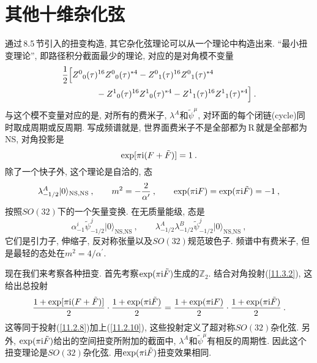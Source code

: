 \section{其他十维杂化弦}

通过\,8.5\,节引入的扭变构造, 其它杂化弦理论可以从一个理论中构造出来. ``最小扭变理论'', 即路径积分截面最少的理论, 对应的是对角模不变量
\begin{align}
    &\frac{1}{2}\Bigl[
    Z^{0}{}_{0}(\tau)^{16}Z^{0}{}_{0}(\tau)^{\ast 4}- Z^{0}{}_{1}(\tau)^{16}Z^{0}{}_{1}(\tau)^{\ast 4} \nonumber \\
    &\qquad \qquad - Z^{1}{}_{0}(\tau)^{16}Z^{1}{}_{0}(\tau)^{\ast 4}-Z^{1}{}_{1}(\tau)^{16}Z^{1}{}_{1}(\tau)^{\ast 4}
    \Bigr]  \:. \label{11.3.1}
\end{align}
与这个模不变量对应的是, 对所有的费米子, $\lambda^{A} $和$ \tilde{\psi}^{\mu}$, 对环面的每个闭链(cycle)同时取成周期或反周期. 写成频谱就是, 世界面费米子不是全部都为\,R\,就是全部都为\,NS, 对角投影是
\begin{equation}
    \exp[\pi\mathrm{i}(F+\tilde{F})] =1 \:. \label{11.3.2}
\end{equation}
除了一个快子外, 这个理论是自洽的, 态
\begin{equation}
    \lambda_{-1/2}^{A}\lvert 0\rangle_{\text{NS,NS}}\:, \qquad m^{2}=-\frac{2}{\alpha^{\prime}}\:,\qquad
    \exp(\pi\mathrm{i} F)=\exp(\pi\mathrm{i}\tilde{F})=-1\:,  \label{11.3.3}
\end{equation}
按照$ SO(32) $下的一个矢量变换. 在无质量能级, 态是
\begin{equation}
    \alpha^{i}_{-1}\tilde{\psi}^{j}_{-1/2} \lvert0\rangle_{\text{NS,NS}} \:, \qquad
    \lambda^{A}_{-1/2}\lambda_{-1/2}^{B}\tilde{\psi}^{j}_{-1/2}\lvert 0\rangle_{\text{NS,NS}} \:, \label{11.3.4}
\end{equation}
它们是引力子, 伸缩子, 反对称张量以及$ SO(32) $规范玻色子. 频谱中有费米子, 但是最轻的态处在$ m^{2}=4/\alpha^{\prime}$.

现在我们来考察各种扭变. 首先考察$ \exp(\pi\mathrm{i} \tilde{F}) $生成的$ \mathds{Z}_{2}$. 结合对角投射(\ref{11.3.2}), 这给出总投射
\begin{equation}
    \frac{1+\exp[\pi\mathrm{i}(F+\tilde{F})]}{2}\cdot \frac{1+\exp(\pi\mathrm{i}\tilde{F})}{2}
    = \frac{1+\exp(\pi\mathrm{i} F)}{2}\cdot \frac{1+\exp(\pi\mathrm{i}\tilde{F})}{2} \:. \label{11.3.5}
\end{equation}
这等同于投射(\ref{11.2.8})加上(\ref{11.2.10}), 这些投射定义了超对称$ SO(32) $杂化弦. 另外, $\exp(\pi\mathrm{i}\tilde{F}) $给出的空间扭变所附加的截面中, $\lambda^{A} $和$ \tilde{\psi}^{\mu} $有相反的周期性. 因此这个扭变理论是$ SO(32) $杂化弦. 用$\exp(\pi\mathrm{i}\tilde{F}) $扭变效果相同.

